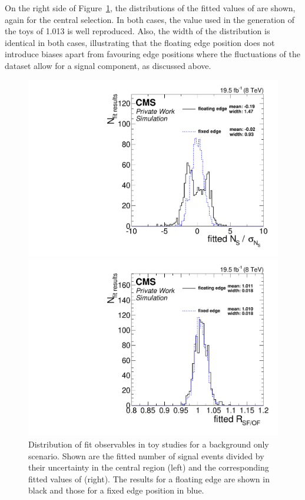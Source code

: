 On the right side of Figure~\ref{fig:toys:backgroundOnly}, the distributions of the fitted values of \Rsfof are shown, again for the central selection. In both cases, the value used in the generation of the toys of 1.013 is well reproduced. Also, the width of the distribution is identical in both cases,  illustrating that the floating edge position does not introduce biases apart from favouring edge positions where the fluctuations of the dataset allow for a signal component, as discussed above.
\begin{figure}[h]
  \centering
  \begin{minipage}[t]{0.49\textwidth}
    \includegraphics[width=\textwidth]{plots/results/fit/toyResults/nS_floatVsFixed.pdf}
  \end{minipage}
  \begin{minipage}[t]{0.49\textwidth}
    \includegraphics[width=\textwidth]{plots/results/fit/toyResults/rSFOF_floatVsFixed.pdf}
  \end{minipage}

  \caption{Distribution of fit observables in toy studies for a background only scenario. Shown are the fitted number of signal events divided by their uncertainty in the central region (left) and the corresponding fitted values of \Rsfof (right). The results for a floating edge are shown in black and those for a fixed edge position in blue.}
  \label{fig:toys:backgroundOnly}
\end{figure}

